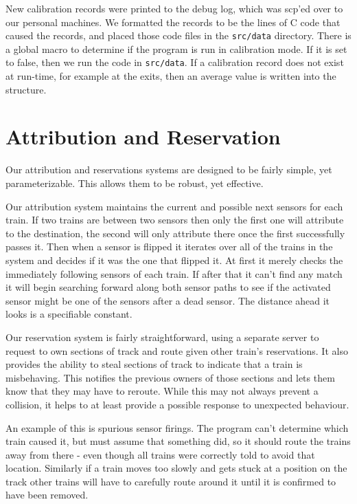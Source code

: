 \documentclass{amsart} \usepackage{amsmath} \usepackage{upgreek}
\begin{document}
New calibration records were printed to the debug log, which was scp'ed over to our personal machines. We formatted the records to be the lines of C code that caused the records, and placed those code files in the \texttt{src/data} directory. There is a global macro to determine if the program is run in calibration mode. If it is set to false, then we run the code in \texttt{src/data}. If a calibration record does not exist at run-time, for example at the exits, then an average value is written into the structure.

\section*{Attribution and Reservation}

Our attribution and reservations systems are designed to be fairly simple, yet
parameterizable. This allows them to be robust, yet effective.

Our attribution system maintains the current and possible next sensors for each
train. If two trains are between two sensors then only the first one will
attribute to the destination, the second will only attribute there once the
first successfully passes it. Then when a sensor is flipped it iterates over all
of the trains in the system and decides if it was the one that flipped it. At
first it merely checks the immediately following sensors of each train. If after
that it can't find any match it will begin searching forward along both sensor
paths to see if the activated sensor might be one of the sensors after a dead
sensor. The distance ahead it looks is a specifiable constant.

Our reservation system is fairly straightforward, using a separate server to
request to own sections of track and route given other train's reservations. It
also provides the ability to steal sections of track to indicate that a train is
misbehaving. This notifies the previous owners of those sections and lets them
know that they may have to reroute. While this may not always prevent a
collision, it helps to at least provide a possible response to unexpected
behaviour.

An example of this is spurious sensor firings. The program can't determine which
train caused it, but must assume that something did, so it should route the
trains away from there - even though all trains were correctly told to avoid
that location. Similarly if a train moves too slowly and gets stuck at a
position on the track other trains will have to carefully route around it until
it is confirmed to have been removed.
\end{document}
